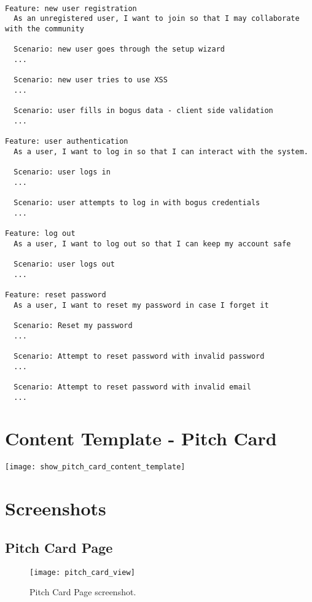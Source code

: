 \begin{verbatim}

Feature: new user registration
  As an unregistered user, I want to join so that I may collaborate with the community

  Scenario: new user goes through the setup wizard
  ...

  Scenario: new user tries to use XSS
  ...

  Scenario: user fills in bogus data - client side validation
  ...

Feature: user authentication
  As a user, I want to log in so that I can interact with the system.

  Scenario: user logs in
  ...

  Scenario: user attempts to log in with bogus credentials
  ...

Feature: log out
  As a user, I want to log out so that I can keep my account safe

  Scenario: user logs out
  ...

Feature: reset password
  As a user, I want to reset my password in case I forget it

  Scenario: Reset my password
  ...

  Scenario: Attempt to reset password with invalid password
  ...
  
  Scenario: Attempt to reset password with invalid email
  ...

\end{verbatim}

\chapter{Content Template - Pitch Card}\label{A:content_template}

\texttt{[image: show\_pitch\_card\_content\_template]}

\chapter{Screenshots}\label{A:screenshots}

\section{Pitch Card Page}\label{A:pitch_card_pitchhub}

\begin{sidewaysfigure}[ht]
    \centering
    \texttt{[image: pitch\_card\_view]}
    \caption{Pitch Card Page screenshot.}
\end{sidewaysfigure}

